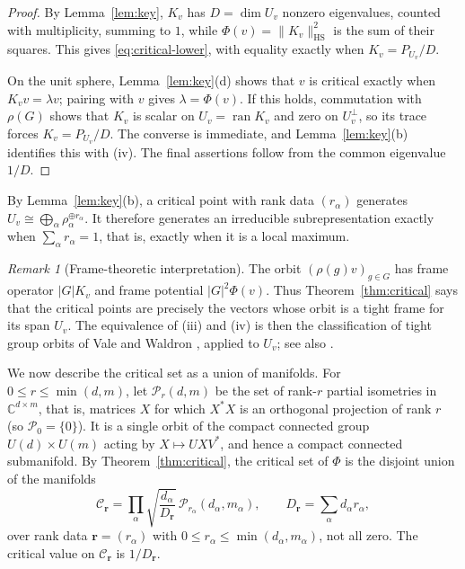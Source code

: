 \documentclass{amsart}
\theoremstyle{remark}
\newtheorem{remark}[theorem]{Remark}
\newcommand{\C}{\mathbb C}
\newcommand{\norm}[1]{\lVert #1\rVert}
\begin{document}
\begin{proof}
By Lemma~\ref{lem:key}, $K_v$ has $D=\dim U_v$ nonzero eigenvalues, counted with multiplicity,
summing to $1$, while $\Phi(v)=\norm{K_v}_{\mathrm{HS}}^2$ is the sum of their squares. This gives
\eqref{eq:critical-lower}, with equality exactly when $K_v=P_{U_v}/D$.
 
On the unit sphere, Lemma~\ref{lem:key}(d) shows that $v$ is critical exactly when
$K_vv=\lambda v$; pairing with $v$ gives $\lambda=\Phi(v)$. If this holds, commutation with $\rho(G)$
shows that $K_v$ is scalar on $U_v=\operatorname{ran}K_v$ and zero on $U_v^\perp$, so its trace
forces $K_v=P_{U_v}/D$. The converse is immediate, and Lemma~\ref{lem:key}(b) identifies this with
(iv). The final assertions follow from the common eigenvalue $1/D$.
\end{proof}
 
By Lemma~\ref{lem:key}(b), a critical point with rank data $(r_\alpha)$ generates
$U_v\cong\bigoplus_\alpha\rho_\alpha^{\oplus r_\alpha}$. It therefore generates an irreducible
subrepresentation exactly when $\sum_\alpha r_\alpha=1$, that is, exactly when it is a local maximum.
 
\begin{remark}[Frame-theoretic interpretation]\label{rem:frames}
The orbit $(\rho(g)v)_{g\in G}$ has frame operator $|G|K_v$ and frame potential $|G|^2\Phi(v)$.
Thus Theorem~\ref{thm:critical} says that the critical points are precisely the vectors whose orbit is a
tight frame for its span $U_v$. The equivalence of \textup{(iii)} and \textup{(iv)} is then the
classification of tight group orbits of Vale and Waldron \cite[Theorem~6.18]{ValeWaldron2005}, applied
to $U_v$; see also \cite{BenedettoFickus2003,Han2007}.
\end{remark}
 
We now describe the critical set as a union of manifolds.
For $0\le r\le\min(d,m)$, let $\mathcal P_r(d,m)$ be the set of rank-$r$ partial isometries in
$\C^{d\times m}$, that is, matrices $X$ for which $X^*X$ is an orthogonal projection of rank $r$
(so $\mathcal P_0=\{0\}$). It is a single orbit of the compact connected group $U(d)\times U(m)$
acting by $X\mapsto UXV^*$, and hence a compact connected submanifold. By
Theorem~\ref{thm:critical}, the critical set of $\Phi$ is the disjoint union of the manifolds
\[
 \mathcal C_{\mathbf r}
 =\prod_\alpha \sqrt{\frac{d_\alpha}{D_{\mathbf r}}}\,\mathcal P_{r_\alpha}(d_\alpha,m_\alpha),
 \qquad
 D_{\mathbf r}=\sum_\alpha d_\alpha r_\alpha,
\]
over rank data $\mathbf r=(r_\alpha)$ with $0\le r_\alpha\le\min(d_\alpha,m_\alpha)$, not all zero.
The critical value on $\mathcal C_{\mathbf r}$ is $1/D_{\mathbf r}$.
 
\end{document}

